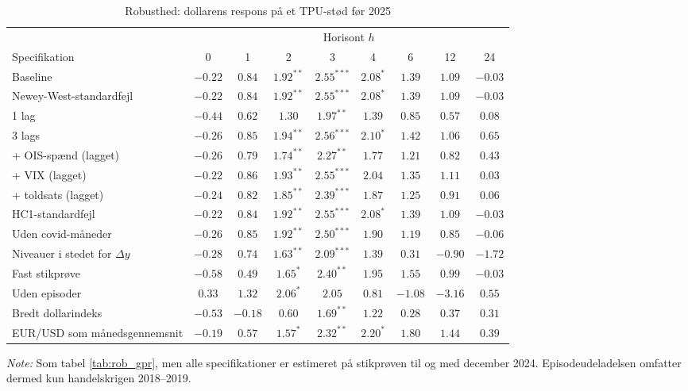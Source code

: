 \begin{table}[H]
\centering
\caption{Robusthed: dollarens respons på et TPU-stød før 2025}
\label{tab:rob_tpu_foer}
\begin{threeparttable}
\begin{tabular}{lcccccccc}
\toprule
 & \multicolumn{8}{c}{Horisont $h$} \\
\cmidrule(lr){2-9}
Specifikation & 0 & 1 & 2 & 3 & 4 & 6 & 12 & 24 \\
\midrule
Baseline & $-0.22$ & $0.84$ & $1.92^{**}$ & $2.55^{***}$ & $2.08^{*}$ & $1.39$ & $1.09$ & $-0.03$ \\
Newey-West-standardfejl & $-0.22$ & $0.84$ & $1.92^{**}$ & $2.55^{***}$ & $2.08^{*}$ & $1.39$ & $1.09$ & $-0.03$ \\
1 lag & $-0.44$ & $0.62$ & $1.30$ & $1.97^{**}$ & $1.39$ & $0.85$ & $0.57$ & $0.08$ \\
3 lags & $-0.26$ & $0.85$ & $1.94^{**}$ & $2.56^{***}$ & $2.10^{*}$ & $1.42$ & $1.06$ & $0.65$ \\
+ OIS-spænd (lagget) & $-0.26$ & $0.79$ & $1.74^{**}$ & $2.27^{**}$ & $1.77$ & $1.21$ & $0.82$ & $0.43$ \\
+ VIX (lagget) & $-0.22$ & $0.86$ & $1.93^{**}$ & $2.55^{***}$ & $2.04$ & $1.35$ & $1.11$ & $0.03$ \\
+ toldsats (lagget) & $-0.24$ & $0.82$ & $1.85^{**}$ & $2.39^{***}$ & $1.87$ & $1.25$ & $0.91$ & $0.06$ \\
HC1-standardfejl & $-0.22$ & $0.84$ & $1.92^{**}$ & $2.55^{***}$ & $2.08^{*}$ & $1.39$ & $1.09$ & $-0.03$ \\
Uden covid-måneder & $-0.26$ & $0.85$ & $1.92^{**}$ & $2.50^{***}$ & $1.90$ & $1.19$ & $0.85$ & $-0.06$ \\
Niveauer i stedet for $\Delta y$ & $-0.28$ & $0.74$ & $1.63^{**}$ & $2.09^{***}$ & $1.39$ & $0.31$ & $-0.90$ & $-1.72$ \\
Fast stikprøve & $-0.58$ & $0.49$ & $1.65^{*}$ & $2.40^{**}$ & $1.95$ & $1.55$ & $0.99$ & $-0.03$ \\
Uden episoder & $0.33$ & $1.32$ & $2.06^{*}$ & $2.05$ & $0.81$ & $-1.08$ & $-3.16$ & $0.55$ \\
Bredt dollarindeks & $-0.53$ & $-0.18$ & $0.60$ & $1.69^{**}$ & $1.22$ & $0.28$ & $0.37$ & $0.31$ \\
EUR/USD som månedsgennemsnit & $-0.19$ & $0.57$ & $1.57^{*}$ & $2.32^{**}$ & $2.20^{*}$ & $1.80$ & $1.44$ & $0.39$ \\
\bottomrule
\end{tabular}
\begin{tablenotes}[flushleft]\footnotesize
\item \textit{Note:} Som tabel \ref{tab:rob_gpr}, men alle specifikationer er estimeret på stikprøven til og med december 2024. Episodeudeladelsen omfatter dermed kun handelskrigen 2018--2019.
\end{tablenotes}
\end{threeparttable}
\end{table}